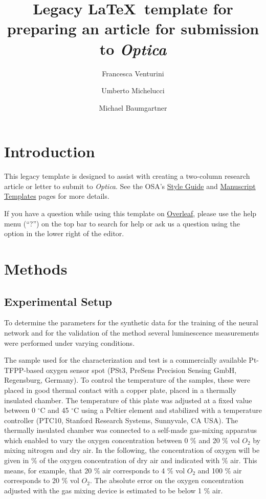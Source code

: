 \documentclass[9pt,twocolumn,twoside,pdftex]{optica}
\title{Legacy \LaTeX\ template for preparing an article for submission to \emph{Optica}}
\author[1,2,*]{Francesca Venturini}
\author[2]{Umberto Michelucci}
\author[1]{Michael Baumgartner}
\affil[1]{Institute of Applied Mathematics and Physics, Zurich University of Applied Sciences,
Technikumstrasse 9, 8401 Winterthur, Switzerland}
\affil[2]{TOELT LLC; Birchlenstr. 25, 8600 Dübendorf, Switzerland}
\affil[*]{Corresponding author: francesca.venturini@zhaw.ch}
\begin{document}
\maketitle

\section{Introduction}

This legacy template is designed to assist with creating a two-column research article or letter to submit to \emph{Optica}. See the OSA's \href{http://www.opticsinfobase.org/submit/style/}{Style Guide} and \href{http://www.opticsinfobase.org/submit/templates/}{Manuscript Templates} pages for more details.

If you have a question while using this template on \href{https://www.overleaf.com}{Overleaf}, please use the help menu (``?'') on the top bar to search for help or ask us a question using the option in the lower right of the editor.

\section{Methods}
\label{sec:methods}


\subsection{Experimental Setup}
\label{Experimental}

To determine the parameters for the synthetic data for the training of the neural network and for the validation of the method several luminescence measurements were performed under varying conditions.

The sample used for the characterization and test is a commercially available Pt-TFPP-based oxygen sensor spot (PSt3, PreSens Precision Sensing GmbH, Regensburg, Germany).
To control the temperature of the samples, these were placed in good thermal contact with a copper plate, placed in a thermally insulated chamber. The temperature of this plate was adjusted at a fixed value between 0 $^\circ$C and 45 $^\circ$C using a Peltier element and stabilized with a temperature controller (PTC10, Stanford Research Systems, Sunnyvale, CA USA). The thermally insulated chamber was connected to a self-made gas-mixing apparatus which enabled to vary the oxygen concentration between 0 $\%$ and 20 $\%$ vol $O_2$ by mixing nitrogen and dry air. In the following, the concentration of oxygen will be given in $\%$ of the oxygen concentration of dry air and indicated with $\%$ air. This means, for example, that 20 $\%$ air corresponds to 4 $\%$ vol $O_2$ and 100 $\%$ air corresponds to 20 $\%$ vol $O_2$.  
The absolute error on the oxygen concentration adjusted with the gas mixing device is estimated to be below 1 $\%$ air. 
\end{document}
